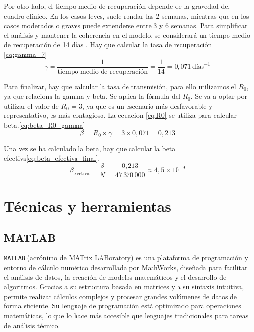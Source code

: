 Por otro lado, el tiempo medio de recuperación depende de la gravedad del cuadro clínico. En los casos leves, suele rondar las 2 semanas, mientras que en los casos moderados o graves puede extenderse entre 3 y 6 semanas. Para simplificar el análisis y mantener la coherencia en el modelo, se considerará un tiempo medio de recuperación de 14 días \cite{ada_duracion_covid}. Hay que calcular la tasa de recuperación \eqref{eq:gamma_7}
\begin{equation}
\gamma = \frac{1}{\text{tiempo medio de recuperación}} = \frac{1}{14} = 0{,}071 \,\text{días}^{-1}
\label{eq:gamma_7}
\end{equation}

Para finalizar, hay que calcular la tasa de transmisión, para ello utilizamos el $R_0$, ya que relaciona la gamma y beta. Se aplica la fórmula del $R_0$. Se va a optar por utilizar el valor de $R_0$ = 3, ya que es un escenario más desfavorable y representativo, es más contagioso. La ecuacion \eqref{eq:R0} se utiliza para calcular beta.\eqref{eq:beta_R0_gamma}
\begin{equation}
\beta = R_0 \times \gamma = 3 \times 0{,}071 = 0{,}213
\label{eq:beta_R0_gamma}
\end{equation}

Una vez se ha calculado la beta, hay que calcular la beta efectiva\eqref{eq:beta_efectiva_final}.
\begin{equation}
\beta_{\text{efectiva}} = \frac{\beta}{N} = \frac{0{,}213}{47\,370\,000} \approx 4{,}5 \times 10^{-9}
\label{eq:beta_efectiva_final}
\end{equation}







\section{Técnicas y herramientas}

\subsection{MATLAB}
\texttt{MATLAB} (acrónimo de MATrix LABoratory) \cite{mathworks_matlab} es una plataforma de programación y entorno de cálculo numérico desarrollada por MathWorks, diseñada para facilitar el análisis de datos, la creación de modelos matemáticos y el desarrollo de algoritmos. Gracias a su estructura basada en matrices y a su sintaxis intuitiva, permite realizar cálculos complejos y procesar grandes volúmenes de datos de forma eficiente. Su lenguaje de programación está optimizado para operaciones matemáticas, lo que lo hace más accesible que lenguajes tradicionales para tareas de análisis técnico.

